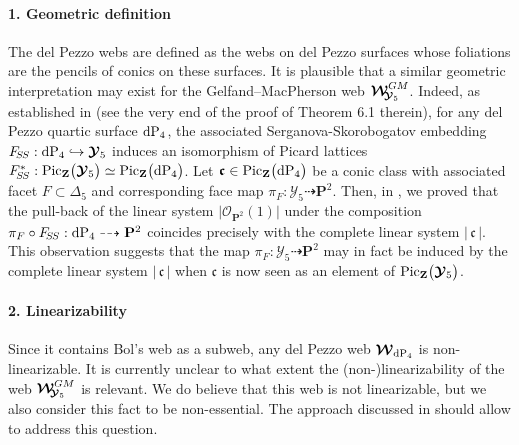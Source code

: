 \documentclass[11pt]{amsart}
\newcommand{\sk}{\smallskip}
\begin{document}
\paragraph{\bf 1. Geometric definition}%
The del Pezzo webs are defined as the webs on del Pezzo surfaces whose foliations are the pencils of conics on these surfaces.
 It is plausible that a similar geometric interpretation may exist for the Gelfand--MacPherson web  $\boldsymbol{\mathcal W}_{\hspace{-0.1cm} \boldsymbol{\mathcal Y}_5}^{GM}$. Indeed, as established in  \cite{SerganovaSkorobogatov} (see the very end of the  proof of Theorem 6.1 therein), for any del Pezzo quartic surface ${\rm dP}_4$, the associated Serganova-Skorobogatov embedding $ F_{\hspace{-0.05cm}S\hspace{-0.03cm}S}: {\rm dP}_4\hookrightarrow \boldsymbol{\mathcal Y}_5$ induces an 
 isomorphism of Picard lattices $F_{\hspace{-0.05cm}S\hspace{-0.03cm}S}^* : {\rm Pic}_{\mathbf Z}\big( \boldsymbol{\mathcal Y}_5 \big)\simeq {\rm Pic}_{\mathbf Z}\big( {\rm dP}_4\big)$. Let $\boldsymbol{\mathfrak c}\in {\rm Pic}_{\mathbf Z}\big( {\rm dP}_4\big)$ be a conic class with associated facet $F\subset \Delta_5$ and corresponding face map $\pi_F: \boldsymbol{\mathcal Y}_5\dashrightarrow \mathbf P^2$. Then, in \cite{PirioAFST}, we proved that the pull-back
 of the linear system $\lvert \mathcal O_{\mathbf P^2}(1)\lvert$ 
  under the composition $\pi_F\circ F_{\hspace{-0.05cm}S\hspace{-0.03cm}S}
 : {\rm dP}_4 \dashrightarrow \mathbf P^2$  coincides precisely with the complete linear system 
  $\lvert \,\boldsymbol{\mathfrak c} \, \lvert$.
 This observation suggests that the %
  map 
  $\pi_F: \boldsymbol{\mathcal Y}_5 \dashrightarrow \mathbf P^2$ 
  may in fact be induced by the complete linear system $\lvert \,\boldsymbol{\mathfrak c} \, \lvert$ when $\boldsymbol{\mathfrak c}$ is now seen as an element of ${\rm Pic}_{\mathbf Z}\big( \boldsymbol{\mathcal Y}_5 \big)$. 
\sk







\paragraph{\bf 2. Linearizability}%
Since it contains Bol's web as a subweb, any del Pezzo web $\boldsymbol{\mathcal W}_{ {\rm dP}_4}$ is non-linearizable. 
It is currently unclear to what extent the (non-)linearizability of the web 
$\boldsymbol{\mathcal W}_{\hspace{-0.1cm} \boldsymbol{\mathcal Y}_5}^{GM}$ 
 is relevant. We do believe that this web is not linearizable, but we also consider this fact to be non-essential.  The approach discussed in \cite{PirioLin} should allow to address this question.\sk 
\end{document}
